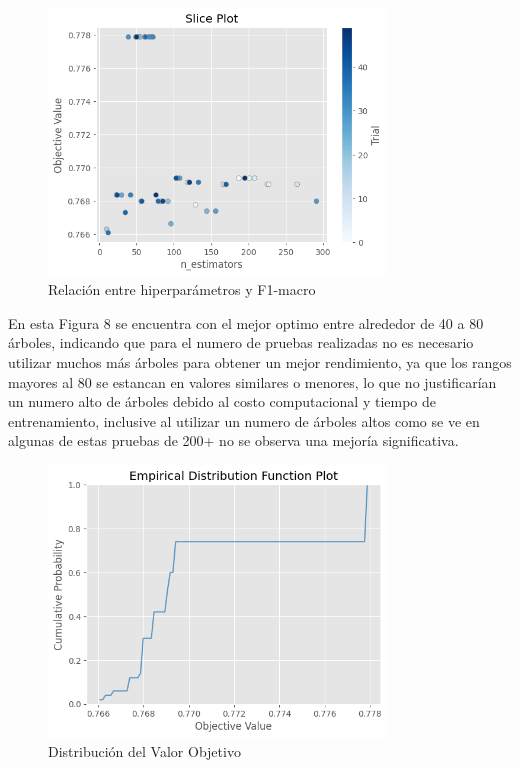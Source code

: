\documentclass[12pt,a4paper]{article}
\begin{document}
\begin{figure}[H]
  \centering
  \includegraphics[width=0.8\textwidth]{../img/SlicePlotRandomForest.png}
  \caption{Relación entre hiperparámetros y F1-macro}\label{fig:slice-plot-random-forest}
\end{figure}

En esta Figura 8 se encuentra con el mejor optimo entre alrededor de 40 a 80 árboles, indicando que para el numero
de pruebas realizadas no es necesario utilizar muchos más árboles para obtener un mejor rendimiento, ya que
los rangos mayores al 80 se estancan en valores similares o menores, lo que no justificarían un numero alto
de árboles debido al costo computacional y tiempo de entrenamiento, inclusive al utilizar
un numero de árboles altos como se ve en algunas de estas pruebas de 200+ no se observa una mejoría significativa.

\begin{figure}[H]
  \centering
  \includegraphics[width=0.8\textwidth]{../img/EDFRandomForest.png}
  \caption{Distribución del Valor Objetivo}\label{fig:edf-random-forest}
\end{figure}
\end{document}
